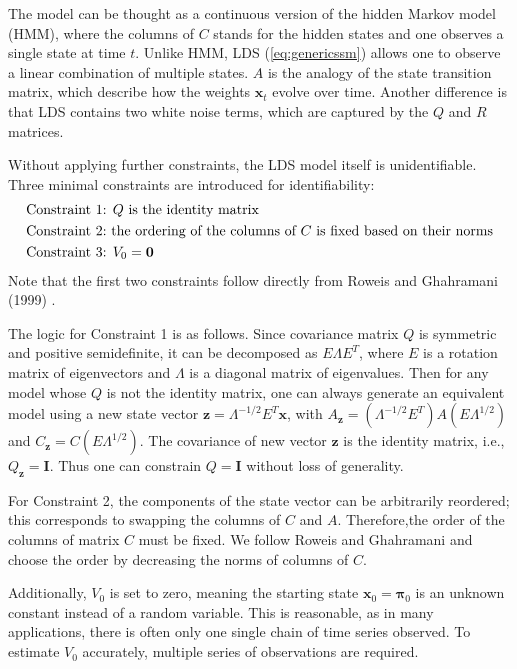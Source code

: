 \documentclass[fleqn,12pt]{article}
\let\oldref\ref
\renewcommand{\ref}[1]{(\oldref{#1})}
\providecommand{\mb}[1]{\boldsymbol{#1}}
\newcommand{\bx}{\mb{x}}
\begin{document}
The model can be thought as a continuous version of the hidden Markov model (HMM), where the columns of $C$ stands for the hidden states and one observes a single state at time $t$. Unlike HMM, LDS \ref{eq:genericssm} allows one to observe a linear combination of multiple states. $A$ is the analogy of the state transition matrix, which describe how the weights $\bx_t$ evolve over time. Another difference is that LDS contains two white noise terms, which are captured by the $Q$ and $R$ matrices.

Without applying further constraints, the LDS model itself is unidentifiable. Three minimal constraints are introduced for identifiability:
\vspace*{-3mm}
\begin{equation*}\label{eq:constraints1}
\begin{aligned}
&\text{Constraint 1: }Q \text{ is the identity matrix}\\
&\text{\text{Constraint 2:} the ordering of the columns of } C \text{ is fixed based on their norms}\\
&\text{Constraint 3: } V_0=\mathbf{0}
\end{aligned}
\end{equation*}
Note that the first two constraints follow directly from Roweis and Ghahramani (1999) \citep{roweis1999unifying}.

The logic for Constraint 1 is as follows. Since covariance matrix $Q$ is symmetric and positive semidefinite, it can be decomposed as $E\Lambda E^T$, where $E$ is a rotation matrix of eigenvectors and $\Lambda$ is a diagonal matrix of eigenvalues. Then for any model whose $Q$ is not the identity matrix, one can always generate an equivalent model using a new state vector $\mathbf{z}=\Lambda^{-1/2} E^T \bx$, with $A_{\mathbf{z}}=(\Lambda^{-1/2}E^T)A(E\Lambda^{1/2})$ and $C_{\mathbf{z}}=C(E\Lambda^{1/2})$. The covariance of new vector $\mathbf{z}$ is the identity matrix, i.e., $Q_{\mathbf{z}}=\mathbf{I}$. Thus one can constrain $Q=\mathbf{I}$ without loss of generality.

For Constraint 2, the components of the state vector can be arbitrarily reordered; this corresponds to swapping the columns of $C$ and $A$. Therefore,the order of the columns of matrix $C$ must be fixed. We follow Roweis and Ghahramani and choose the order by decreasing the norms of columns of $C$.

Additionally, $V_0$ is set to zero, meaning the starting state $\bx_0=\mathbf{\pi}_0$ is an unknown constant instead of a random variable. This is reasonable, as in many applications, there is often only one single chain of time series observed. To estimate $V_0$ accurately, multiple series of observations are required.
\end{document}
